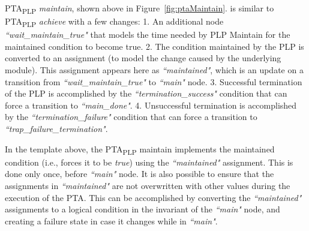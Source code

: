 \documentclass[letterpaper]{article}
\newcommand\rNote[1]{\todo[inline, author=Ronen, color=yellow]{#1}}
\newcommand\aNote[1]{\todo[inline, author=Alex, color=GreenYellow]{#1}}
\newcommand\commentout[1]{}
\newcommand{\frameImage}[4]{
\begin{figure}[H]
  \centerline{
    \fcolorbox{frameColor}{white}{
        \texttt{[image: \#1]} } }
    \caption{#4}
    \label{fig:#1}
\end{figure}
}
\begin{document}
{%
PTA\textsubscript{PLP} \textit{maintain}, shown above in  Figure~\ref{fig:ptaMaintain}. is similar to PTA\textsubscript{PLP} \textit{achieve} with a few changes:
1. An additional node \textit{``wait\_maintain\_true"} that models the time needed by PLP Maintain for the maintained condition to become true.
2. The condition maintained by the PLP is converted to an assignment (to model the change caused by the underlying module). This assignment appears here as \textit{``maintained"}, which is an update on a transition from \textit{``wait\_maintain\_true"} to \textit{``main"} node.
3. Successful termination of the PLP is accomplished by the \textit{``termination\_success"} condition that can force a transition to \textit{``main\_done"}. 4.  Unsuccessful termination is accomplished by the \textit{``termination\_failure"} condition that can force a transition to \textit{``trap\_failure\_termination"}.
\par In the template above, the PTA\textsubscript{PLP} maintain implements the maintained condition (i.e., forces it to be \textit{true})
using the \textit{``maintained"} assignment.
This is done only once, before \textit{``main"} node. It is also possible to
ensure that the assignments in \textit{``maintained"} are not overwritten with other values during the execution of the PTA. This can be accomplished by converting the \textit{``maintained"} assignments to a logical condition in the invariant of the \textit{``main"} node, and creating a failure state in case it changes while in \textit{``main"}.

\commentout{
}}
\end{document}
